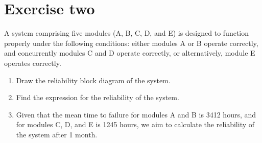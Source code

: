 \section{Exercise two}

A system comprising five modules (A, B, C, D, and E) is designed to function properly under the following conditions: either modules A or B operate correctly, and concurrently modules C and D operate correctly, or alternatively, module E operates correctly.
\begin{enumerate}
    \item Draw the reliability block diagram of the system.
    \item Find the expression for the reliability of the system.
    \item Given that the mean time to failure for modules A and B is 3412 hours, and for modules C, D, and E is 1245 hours, we aim to calculate the reliability of the system after 1 month.
\end{enumerate}

